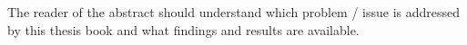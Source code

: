 The reader of the abstract should understand which problem / issue is addressed by this thesis book and what findings and results are available.
